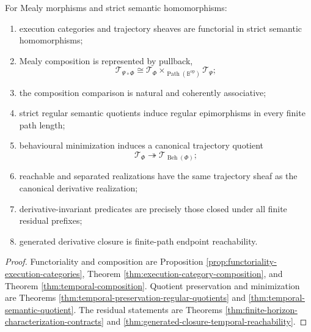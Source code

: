 \begin{theorem}
\label{thm:temporal-semantics-minimization-summary}
For Mealy morphisms and strict semantic homomorphisms:
\begin{enumerate}
    \item execution categories and trajectory sheaves are functorial in strict
    semantic homomorphisms;
    \item Mealy composition is represented by pullback,
    \[
        \mathscr T_{\Psi\circ\Phi}
        \cong
        \mathscr T_\Phi
        \times_{\operatorname{Path}(\mathbb B^{\mathrm{op}})}
        \mathscr T_\Psi;
    \]
    \item the composition comparison is natural and coherently associative;
    \item strict regular semantic quotients induce regular epimorphisms in
    every finite path length;
    \item behavioural minimization induces a canonical trajectory quotient
    \[
        \mathscr T_\Phi
        \twoheadrightarrow
        \mathscr T_{\operatorname{Beh}(\Phi)};
    \]
    \item reachable and separated realizations have the same trajectory sheaf
    as the canonical derivative realization;
    \item derivative-invariant predicates are precisely those closed under all
    finite residual prefixes;
    \item generated derivative closure is finite-path endpoint reachability.
\end{enumerate}
\end{theorem}

\begin{proof}
Functoriality and composition are Proposition
\ref{prop:functoriality-execution-categories}, Theorem
\ref{thm:execution-category-composition}, and Theorem
\ref{thm:temporal-composition}.  Quotient preservation and minimization are
Theorems \ref{thm:temporal-preservation-regular-quotients} and
\ref{thm:temporal-semantic-quotient}.  The residual statements are Theorems
\ref{thm:finite-horizon-characterization-contracts} and
\ref{thm:generated-closure-temporal-reachability}.
\end{proof}

